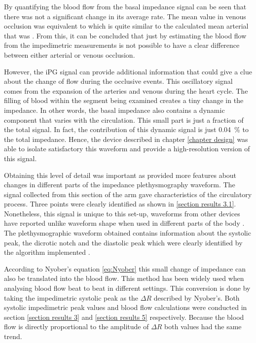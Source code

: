 By quantifying the blood flow from the basal impedance signal can be seen that there was not a significant change in its average rate. The mean value in venous occlusion was equivalent to \flowbasalvenous{} which is quite similar to the calculated mean arterial that was \flowbasalarterial{}. From this, it can be concluded that just by estimating the blood flow from the impedimetric measurements is not possible to have a clear difference between either arterial or venous occlusion.

However, the iPG signal can provide additional information that could give a clue about the change of flow during the occlusive events. This oscillatory signal comes from the expansion of the arteries and venous during the heart cycle. The filling of blood within the segment being examined creates a tiny change in the impedance. In other words, the basal impedance also contains a dynamic component that varies with the circulation. This small part is just a fraction of the total signal. In fact, the contribution of this dynamic signal is just \SI{0.04}{\percent} to the total impedance. Hence, the device described in chapter \ref{chapter design} was able to isolate satisfactory this waveform and provide a high-resolution version of this signal.

Obtaining this level of detail was important as provided more features about changes in different parts of the impedance plethysmography waveform. The signal collected from this section of the arm gave characteristics of the circulatory process. Three points were clearly identified as shown in \ref{section results 3.1}. Nonetheless, this signal is unique to this set-up, waveforms from other devices have reported unlike waveform shape when used in different parts of the body . The plethysmographic waveform obtained contains information about the systolic peak, the dicrotic notch and the diastolic peak which were clearly identified by the algorithm implemented . 

According to Nyober's equation \ref{eq:Nyober} this small change of impedance can also be translated into the blood flow.  This method has been widely used when analysing blood flow beat to beat  in different settings. This conversion is done by taking the impedimetric systolic peak as the $\Delta R$ described by Nyober's. Both systolic impedimetric peak values and blood flow calculations were conducted in section \ref{section results 3} and \ref{section results 5} respectively.  Because the blood flow is directly proportional to the amplitude of $\Delta R$ both values had the same trend. 

